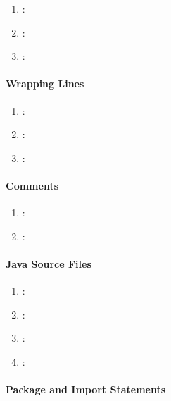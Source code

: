 \begin{enumerate} [resume]
	\item \emph{\checkL}:
	\item \emph{\checkM}:
	\item \emph{\checkN}:
\end{enumerate}

\paragraph{Wrapping Lines} %
\label{par:wrapping_lines}

\begin{enumerate} [resume]
	\item \emph{\checkO}:
	\item \emph{\checkP}:
	\item \emph{\checkQ}:
\end{enumerate}

\paragraph{Comments} %
\label{par:comments}

\begin{enumerate} [resume]
	\item \emph{\checkR}:
	\item \emph{\checkS}:
\end{enumerate}


\paragraph{Java Source Files} %
\label{par:java_source_files}

\begin{enumerate} [resume]
	\item \emph{\checkT}:
	\item \emph{\checkU}:
	\item \emph{\checkV}:
	\item \emph{\checkW}:
\end{enumerate}

\paragraph{Package and Import Statements} %
\label{par:package_and_import_statements}

